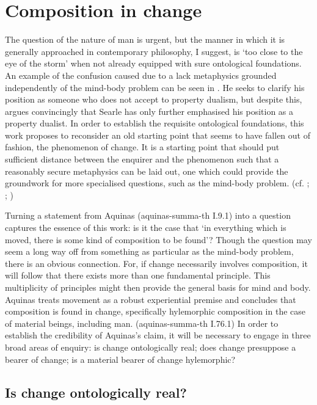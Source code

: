 \section{Composition in change}

The question of the nature of man is urgent, but the manner in which it is generally approached in contemporary philosophy, I suggest, is `too close to the eye of the storm' when not already equipped with sure ontological foundations. An example of the confusion caused due to a lack metaphysics grounded independently of the mind-body problem can be seen in \textcite[][]{Searle2002-SEAWIA}. He seeks to clarify his position as someone who does not accept to property dualism, but despite this, \textcite[][]{feser-2004-searle} argues convincingly that Searle has only further emphasised his position as a property dualist.
In order to establish the requisite ontological foundations, this work proposes to reconsider an old starting point that seems to have fallen out of fashion, the phenomenon of change. It is a starting point that should put sufficient distance between the enquirer and the phenomenon such that a reasonably secure metaphysics can be laid out, one which could provide the groundwork for more specialised questions, such as the mind-body problem.
(cf. \cite[][]{sep-change}; \cite[][]{sep-temporal-parts}; \cite[][17--68]{feser2017five})

Turning a statement from Aquinas (\acrshort{aquinas-summa-th} I.9.1) into a question captures the essence of this work: is it the case that `in everything which is moved, there is some kind of composition to be found'?
Though the question may seem a long way off from something as particular as the mind-body problem, there is an obvious connection.
For, if change necessarily involves composition, it will follow that there exists more than one fundamental principle. This multiplicity of principles might then provide the general basis for mind and body.
Aquinas treats movement as a robust experiential premise and concludes that composition is found in change, specifically hylemorphic composition in the case of material beings, including man.
(\acrshort{aquinas-summa-th} I.76.1)
In order to establish the credibility of Aquinas's claim, it will be necessary to engage in three broad areas of enquiry:
is change ontologically real; does change presuppose a bearer of change; is a material bearer of change hylemorphic?

\subsection{Is change ontologically real?}

